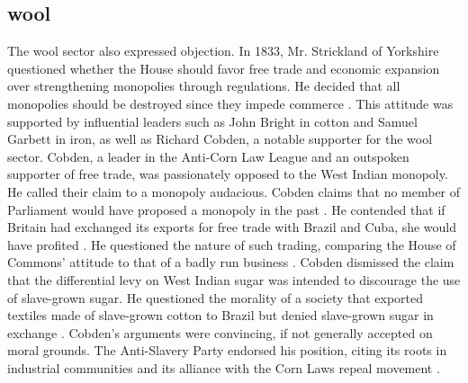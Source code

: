 \subsection{wool}
The wool sector also expressed objection. In 1833, Mr. Strickland of Yorkshire questioned whether the House should favor free trade and economic expansion over strengthening monopolies through regulations. He decided that all monopolies should be destroyed since they impede commerce . This attitude was supported by influential leaders such as John Bright in cotton and Samuel Garbett in iron, as well as Richard Cobden, a notable supporter for the wool sector. Cobden, a leader in the Anti-Corn Law League and an outspoken supporter of free trade, was passionately opposed to the West Indian monopoly. He called their claim to a monopoly audacious. Cobden claims that no member of Parliament would have proposed a monopoly in the past . He contended that if Britain had exchanged its exports for free trade with Brazil and Cuba, she would have profited . He questioned the nature of such trading, comparing the House of Commons' attitude to that of a badly run business . Cobden dismissed the claim that the differential levy on West Indian sugar was intended to discourage the use of slave-grown sugar. He questioned the morality of a society that exported textiles made of slave-grown cotton to Brazil but denied slave-grown sugar in exchange . Cobden's arguments were convincing, if not generally accepted on moral grounds. The Anti-Slavery Party endorsed his position, citing its roots in industrial communities and its alliance with the Corn Laws repeal movement .
